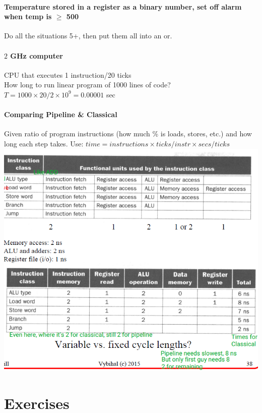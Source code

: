 \documentclass[12 pt]{article}
\begin{document}
		\paragraph{Temperature stored in a register as a binary number, set off alarm when temp is $\geq$ 500} Do all the situations 5+, then put them all into an or.
		\paragraph{$2$ GHz computer}
		CPU that executes 1 instruction/20 ticks
		\\ How long to run linear program of 1000 lines of code?
		\\$T=1000\times 20/2\times10^9=0.00001$ sec
		\paragraph{Comparing Pipeline \& Classical}
		Given ratio of program instructions (how much \% is loads, stores, etc.) and how long each step takes. Use: $time=instructions \times ticks/instr \times secs/ticks$
		\includegraphics[scale=0.6]{vfx}
		\section{Exercises}
\end{document}
